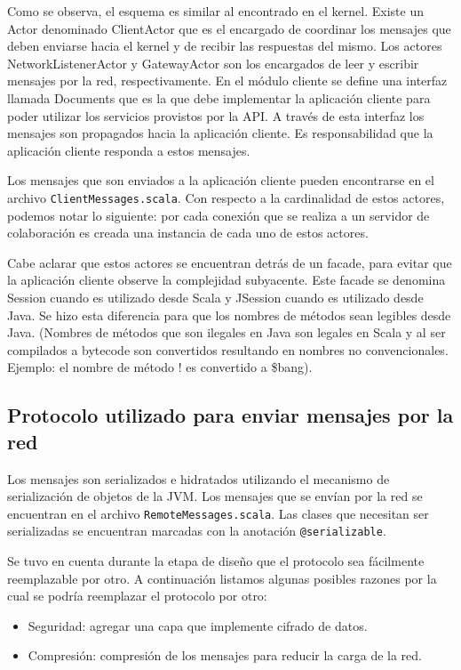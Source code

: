\documentclass[12pt,a4paper]{article}
\begin{document}
Como se observa, el esquema es similar al encontrado en el kernel. Existe un Actor denominado ClientActor que es el
encargado de coordinar los mensajes que deben enviarse hacia el kernel y de recibir las respuestas del mismo.
Los actores NetworkListenerActor y GatewayActor son los encargados de leer y escribir mensajes por la red, respectivamente.
En el módulo cliente se define una interfaz llamada Documents que es la que debe implementar la aplicación cliente para poder
utilizar los servicios provistos por la API.
A través de esta interfaz los mensajes son propagados hacia la aplicación cliente. Es responsabilidad que la aplicación cliente
responda a estos mensajes.

Los mensajes que son enviados a la aplicación cliente pueden encontrarse en el archivo 
\texttt{ClientMessages.scala}.
Con respecto a la cardinalidad de estos actores, podemos notar lo siguiente:
por cada conexión que se realiza a un servidor de colaboración es creada una instancia de cada uno de estos actores.

Cabe aclarar que estos actores se encuentran detrás de un facade, para evitar que la aplicación cliente observe la
complejidad subyacente. Este facade se denomina Session cuando es utilizado desde Scala y JSession cuando es utilizado desde Java.
Se hizo esta diferencia para que los nombres de métodos sean legibles desde Java. (Nombres de métodos que son ilegales en Java son
legales en Scala y al ser compilados a bytecode son convertidos resultando en nombres no convencionales. Ejemplo: el nombre de 
método ! es convertido a \$bang).


\subsection{Protocolo utilizado para enviar mensajes por la red}
Los mensajes son serializados e hidratados utilizando el mecanismo de serialización de objetos de la JVM. Los mensajes que se
envían por la red se encuentran en el archivo
\texttt{RemoteMessages.scala}.
Las clases que necesitan ser serializadas se encuentran marcadas con la anotación \texttt{@serializable}.

Se tuvo en cuenta durante la etapa de diseño que el protocolo sea fácilmente reemplazable por otro. A continuación listamos
algunas posibles razones por la cual se podría reemplazar el protocolo por otro:

\begin{itemize}
	\item Seguridad: agregar una capa que implemente cifrado de datos.
	\item Compresión: compresión de los mensajes para reducir la carga de la red.
\end{itemize}
\end{document}
